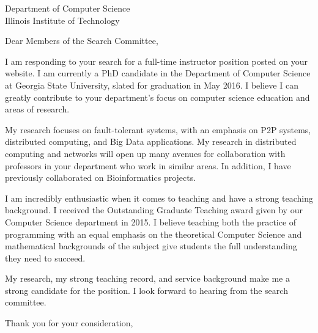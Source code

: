 \documentclass[12pt]{letter}
\date{}
\begin{document}
 
\begin{letter}{Department of Computer Science\\Illinois Institute of Technology} 
\opening{Dear Members of the Search Committee,} 
 
I am responding to your search for a full-time instructor position posted on your website.
I am currently a PhD candidate in the Department of Computer Science at Georgia State University, slated for graduation in May 2016.
I believe I can greatly contribute to your department's focus on computer science education and areas of research.

My research focuses on fault-tolerant systems, with an emphasis on P2P systems, distributed computing, and Big Data applications.
My research in distributed computing and networks will open up many avenues for collaboration with professors in your department who work in similar areas.
In addition, I have previously collaborated on Bioinformatics projects.



I am incredibly enthusiastic when it comes to teaching and have a strong teaching background.
I received the Outstanding Graduate Teaching award given by our Computer Science department in 2015.
I believe teaching both the practice of programming with an equal emphasis on the theoretical Computer Science and mathematical backgrounds of the subject give students the full understanding they need to succeed.




My research, my strong teaching record, and service background make me a strong candidate for the position.
I look forward to hearing from the search committee.


\closing{Thank you for your consideration,} 
\end{letter} 
\end{document}
